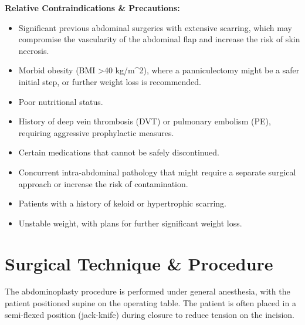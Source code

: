 \textbf{Relative Contraindications \& Precautions:}
\begin{itemize}
  \item Significant previous abdominal surgeries with extensive scarring, which may compromise the vascularity of the abdominal flap and increase the risk of skin necrosis.
  \item Morbid obesity (BMI >40 kg/m\textasciicircum2), where a panniculectomy might be a safer initial step, or further weight loss is recommended.
  \item Poor nutritional status.
  \item History of deep vein thrombosis (DVT) or pulmonary embolism (PE), requiring aggressive prophylactic measures.
  \item Certain medications that cannot be safely discontinued.
  \item Concurrent intra-abdominal pathology that might require a separate surgical approach or increase the risk of contamination.
  \item Patients with a history of keloid or hypertrophic scarring.
\item Unstable weight, with plans for further significant weight loss.
\end{itemize}

\section*{Surgical Technique \& Procedure}
The abdominoplasty procedure is performed under general anesthesia, with the patient positioned supine on the operating table. The patient is often placed in a semi-flexed position (jack-knife) during closure to reduce tension on the incision.

